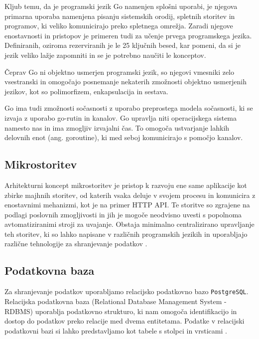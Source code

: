 \documentclass[a4paper, 12pt]{book}
\begin{document}
Kljub temu, da je programski jezik Go namenjen splošni uporabi, je njegova primarna uporaba namenjena pisanju sistemskih orodij, spletnih storitev in programov, ki veliko komunicirajo preko  spletnega omrežja. Zaradi njegove enostavnosti in pristopov je primeren tudi za učenje prvega programskega jezika. Definiranih, oziroma rezerviranih je le 25 ključnih besed, kar pomeni, da si je jezik veliko lažje zapomniti in se je potrebno naučiti le konceptov.

Čeprav Go ni objektno usmerjen programski jezik, so njegovi vmesniki zelo vsestranski in omogočajo posnemanje nekaterih zmožnosti objektno usmerjenih jezikov, kot so polimorfizem, enkapsulacija in sestava.

Go ima tudi zmožnosti sočasnosti z uporabo preprostega modela sočasnosti, ki se izvaja z uporabo go-rutin in kanalov. Go upravlja niti operacijskega sistema namesto nas in ima zmogljiv izvajalni čas. To omogoča ustvarjanje lahkih delovnih enot (ang. goroutine), ki med seboj komunicirajo s pomočjo kanalov.
 
\subsection{Mikrostoritev}
Arhitekturni koncept mikrostoritev je pristop k razvoju ene same aplikacije kot zbirke majhnih storitev, od katerih vsaka deluje v svojem procesu in komunicira z enostavnimi mehanizmi, kot je na primer HTTP API. Te storitve so zgrajene na podlagi poslovnih zmogljivosti in jih je mogoče neodvisno uvesti s popolnoma avtomatiziranimi stroji za uvajanje. Obstaja minimalno centralizirano upravljanje teh storitev, ki so lahko napisane v različnih programskih jezikih in uporabljajo različne tehnologije za shranjevanje podatkov \cite{mfowler-microservices}. 


\subsection{Podatkovna baza}
Za shranjevanje podatkov uporabljamo relacijsko podatkovno bazo \verb=PostgreSQL=. Relacijska podatkovna baza (Relational Database Management System - RDBMS) uporablja podatkovno strukturo, ki nam omogoča identifikacijo in dostop do podatkov preko relacije med dvema entitetama. Podatke v relacijski podatkovni bazi si lahko predstavljamo kot tabele s stolpci in vrsticami \cite{oracle-rdbms}.


\end{document}
